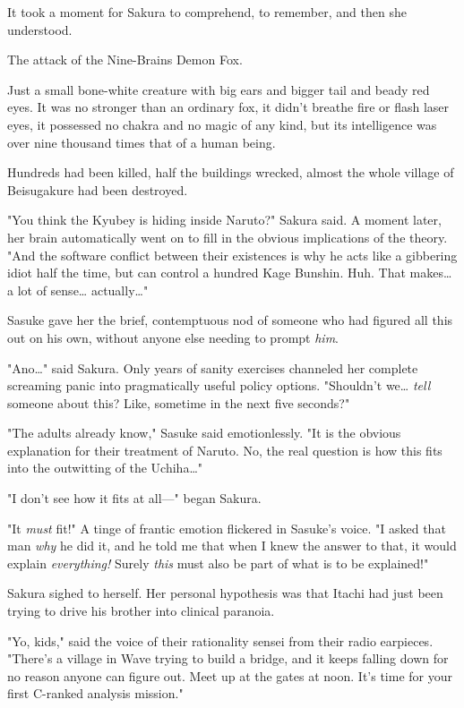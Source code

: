It took a moment for Sakura to comprehend, to remember, and then she understood.

The attack of the Nine-Brains Demon Fox.

Just a small bone-white creature with big ears and bigger tail and beady red 
eyes. It was no stronger than an ordinary fox, it didn't breathe fire or flash 
laser eyes, it possessed no chakra and no magic of any kind, but its 
intelligence was over nine thousand times that of a human being.

Hundreds had been killed, half the buildings wrecked, almost the whole village 
of Beisugakure had been destroyed.

"You think the Kyubey is hiding inside Naruto?" Sakura said. A moment later, 
her brain automatically went on to fill in the obvious implications of the 
theory. "And the software conflict between their existences is why he acts like 
a gibbering idiot half the time, but can control a hundred Kage Bunshin. Huh. 
That makes{\ldots} a lot of sense{\ldots} actually{\ldots}"

Sasuke gave her the brief, contemptuous nod of someone who had figured all this 
out on his own, without anyone else needing to prompt \emph{him}.

"Ano{\ldots}" said Sakura. Only years of sanity exercises channeled her 
complete screaming panic into pragmatically useful policy options. "Shouldn't 
we{\ldots} \emph{tell} someone about this? Like, sometime in the next five 
seconds?"

"The adults already know," Sasuke said emotionlessly. "It is the obvious 
explanation for their treatment of Naruto. No, the real question is how this 
fits into the outwitting of the Uchiha{\ldots}"

"I don't see how it fits at all---" began Sakura.

"It \emph{must} fit!" A tinge of frantic emotion flickered in Sasuke's voice. 
"I asked that man \emph{why} he did it, and he told me that when I knew the 
answer to that, it would explain \emph{everything!} Surely \emph{this} must 
also be part of what is to be explained!"

Sakura sighed to herself. Her personal hypothesis was that Itachi had just been 
trying to drive his brother into clinical paranoia.

"Yo, kids," said the voice of their rationality sensei from their radio 
earpieces. "There's a village in Wave trying to build a bridge, and it keeps 
falling down for no reason anyone can figure out. Meet up at the gates at noon. 
It's time for your first C-ranked analysis mission."

